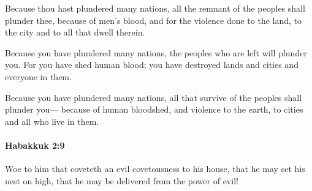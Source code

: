 			\begin{versebox}
					\item[BHS] 
					\item[LXX] 
					\item[ASV] Because thou hast plundered many nations, all the remnant of the peoples shall plunder thee, because of men's blood, and for the violence done to the land, to the city and to all that dwell therein.
					\item[NIV] Because you have plundered many nations, the peoples who are left will plunder you. For you have shed human blood; you have destroyed lands and cities and everyone in them.
					\item[NRSV] Because you have plundered many nations, all that survive of the peoples shall plunder you— because of human bloodshed, and violence to the earth, to cities and all who live in them.
			\end{versebox}

		\paragraph{Habakkuk 2:9} %
			\label{HABAKKUK-2-9}

			Woe to him that coveteth an evil covetousness to his house, that he may set his nest on high, that he may be delivered from the power of evil!

